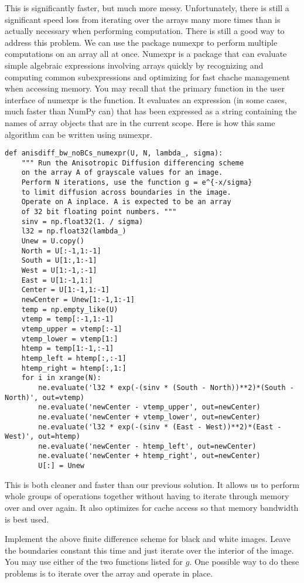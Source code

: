 This is significantly faster, but much more messy.
Unfortunately, there is still a significant speed loss from iterating over the arrays many more times than is actually necessary when performing computation.
There is still a good way to address this problem.
We can use the package numexpr to perform multiple computations on an array all at once.
Numexpr is a package that can evaluate simple algebraic expressions involving arrays quickly by recognizing and computing common subexpressions and optimizing for fast chache management when accessing memory.
You may recall that the primary function in the user interface of numexpr is the  function.
It evaluates an expression (in some cases, much faster than NumPy can) that has been expressed as a string containing the names of array objects that are in the current scope.
Here is how this same algorithm can be written using numexpr.
\begin{lstlisting}
def anisdiff_bw_noBCs_numexpr(U, N, lambda_, sigma):
    """ Run the Anisotropic Diffusion differencing scheme
    on the array A of grayscale values for an image.
    Perform N iterations, use the function g = e^{-x/sigma}
    to limit diffusion across boundaries in the image.
    Operate on A inplace. A is expected to be an array
    of 32 bit floating point numbers. """
    sinv = np.float32(1. / sigma)
    l32 = np.float32(lambda_)
    Unew = U.copy()
    North = U[:-1,1:-1]
    South = U[1:,1:-1]
    West = U[1:-1,:-1]
    East = U[1:-1,1:]
    Center = U[1:-1,1:-1]
    newCenter = Unew[1:-1,1:-1]
    temp = np.empty_like(U)
    vtemp = temp[:-1,1:-1]
    vtemp_upper = vtemp[:-1]
    vtemp_lower = vtemp[1:]
    htemp = temp[1:-1,:-1]
    htemp_left = htemp[:,:-1]
    htemp_right = htemp[:,1:]
    for i in xrange(N):
        ne.evaluate('l32 * exp(-(sinv * (South - North))**2)*(South - North)', out=vtemp)
        ne.evaluate('newCenter - vtemp_upper', out=newCenter)
        ne.evaluate('newCenter + vtemp_lower', out=newCenter)
        ne.evaluate('l32 * exp(-(sinv * (East - West))**2)*(East - West)', out=htemp)
        ne.evaluate('newCenter - htemp_left', out=newCenter)
        ne.evaluate('newCenter + htemp_right', out=newCenter)
        U[:] = Unew
\end{lstlisting}
This is both cleaner and faster than our previous solution.
It allows us to perform whole groups of operations together without having to iterate through memory over and over again.
It also optimizes for cache access so that memory bandwidth is best used.

\begin{problem}
Implement the above finite difference scheme for black and white images.
Leave the boundaries constant this time and just iterate over the interior of the image.
You may use either of the two functions listed for $g$.
One possible way to do these problems is to iterate over the array and operate in place.
\end{problem}


